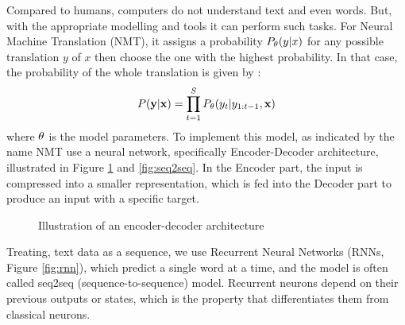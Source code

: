 Compared to humans, computers do not understand text and even words. But, with the appropriate modelling and tools it can perform such tasks. For Neural Machine Translation (NMT), it assigns a probability  $P_{\mathbf{\theta}}(y|x)$ for any possible translation $y$ of $x$ then choose the one with the highest probability. In that case, the probability of the whole translation is given by :
\begin{equation}
	P(\mathbf{y}|\mathbf{x})=\prod_{t=1}^S P_{\mathbf{\theta}}(y_t|y_{1:t-1}, \mathbf{x})
\end{equation}
where $\mathbf{\theta}$ is the model parameters.
To implement this model, as indicated by the name NMT use a neural network, specifically Encoder-Decoder architecture, illustrated in Figure \ref{fig:enc-dec} and \ref{fig:seq2seq}. In the Encoder part, the input is compressed into a smaller representation, which is fed into the Decoder part to produce an input with a specific target.
\begin{figure}[H]
	\centering
	\caption{Illustration of an encoder-decoder architecture}
	\label{fig:enc-dec}
\end{figure}
Treating, text data as a sequence, we use Recurrent Neural Networks (RNNs, Figure \ref{fig:rnn}), which predict a single word at a time, and the model is often called seq2seq (sequence-to-sequence) model. Recurrent neurons depend on their previous outputs or states, which is the property that differentiates them from classical neurons.
